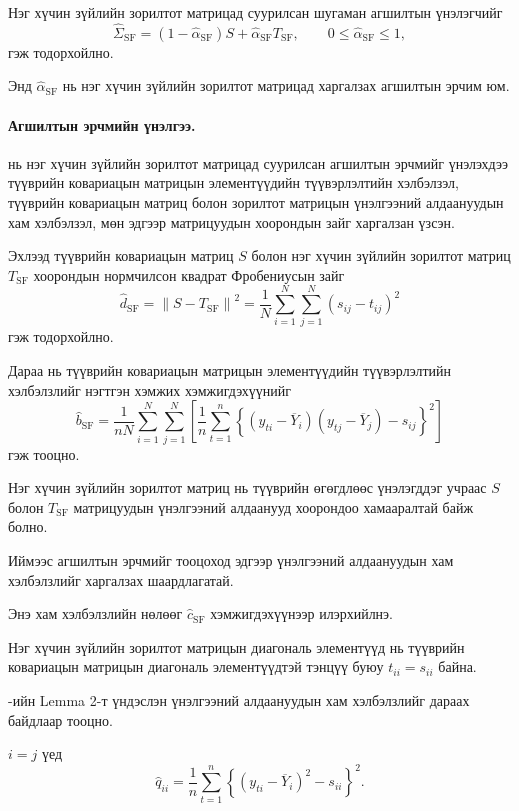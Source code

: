 Нэг хүчин зүйлийн зорилтот матрицад суурилсан
шугаман агшилтын үнэлэгчийг
\[
\widehat{\Sigma}_{\mathrm{SF}}
=
(1-\widehat{\alpha}_{\mathrm{SF}})S
+
\widehat{\alpha}_{\mathrm{SF}}T_{\mathrm{SF}},
\qquad
0\leq\widehat{\alpha}_{\mathrm{SF}}\leq1,
\]
гэж тодорхойлно.

Энд $\widehat{\alpha}_{\mathrm{SF}}$ нь нэг хүчин
зүйлийн зорилтот матрицад харгалзах агшилтын
эрчим юм.

\paragraph{Агшилтын эрчмийн үнэлгээ.}

\citet{ledoitwolf2003} нь нэг хүчин зүйлийн
зорилтот матрицад суурилсан агшилтын эрчмийг
үнэлэхдээ түүврийн ковариацын матрицын
элементүүдийн түүвэрлэлтийн хэлбэлзэл,
түүврийн ковариацын матриц болон зорилтот
матрицын үнэлгээний алдаануудын хам хэлбэлзэл,
мөн эдгээр матрицуудын хоорондын зайг
харгалзан үзсэн.

Эхлээд түүврийн ковариацын матриц $S$ болон
нэг хүчин зүйлийн зорилтот матриц
$T_{\mathrm{SF}}$ хоорондын нормчилсон
квадрат Фробениусын зайг
\[
\widehat d_{\mathrm{SF}}
=
\left\|S-T_{\mathrm{SF}}\right\|^2=
\frac{1}{N}
\sum_{i=1}^{N}
\sum_{j=1}^{N}
(s_{ij}-t_{ij})^2
\]
гэж тодорхойлно.

Дараа нь түүврийн ковариацын матрицын
элементүүдийн түүвэрлэлтийн хэлбэлзлийг
нэгтгэн хэмжих хэмжигдэхүүнийг
\[
\widehat b_{\mathrm{SF}}
=
\frac{1}{nN}
\sum_{i=1}^{N}
\sum_{j=1}^{N}
\left[
\frac{1}{n}
\sum_{t=1}^{n}
\left\{
(y_{ti}-\overline{Y}_i)
(y_{tj}-\overline{Y}_j)
-s_{ij}
\right\}^{2}
\right]
\]
гэж тооцно.

Нэг хүчин зүйлийн зорилтот матриц нь
түүврийн өгөгдлөөс үнэлэгддэг учраас
$S$ болон $T_{\mathrm{SF}}$ матрицуудын
үнэлгээний алдаанууд хоорондоо
хамааралтай байж болно.

Иймээс агшилтын эрчмийг тооцоход
эдгээр үнэлгээний алдаануудын
хам хэлбэлзлийг харгалзах шаардлагатай.

Энэ хам хэлбэлзлийн нөлөөг
$\widehat c_{\mathrm{SF}}$ хэмжигдэхүүнээр
илэрхийлнэ.

Нэг хүчин зүйлийн зорилтот матрицын диагональ
элементүүд нь түүврийн ковариацын матрицын
диагональ элементүүдтэй тэнцүү буюу
$t_{ii}=s_{ii}$ байна.

\citet{ledoitwolf2003}-ийн Lemma 2-т
үндэслэн үнэлгээний алдаануудын
хам хэлбэлзлийг дараах байдлаар тооцно.

$i=j$ үед
\[
\widehat q_{ii}
=
\frac{1}{n}
\sum_{t=1}^{n}
\left\{
(y_{ti}-\overline{Y}_i)^2-s_{ii}
\right\}^{2}.
\]

